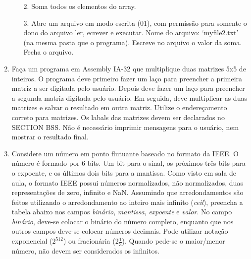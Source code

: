 \begin{enumerate}[resume]
\begin{enumerate}
        \item [2.]
        Soma todos os elementos do array.

        \item [3.]
        Abre um arquivo em modo escrita (01), com permissão
        para somente o dono do arquivo ler, ecrever e executar. 
        Nome do arquivo: `myfile2.txt' (na mesma pasta que o programa). 
        Escreve no arquivo o valor da soma.
        Fecha o arquivo.
    \end{enumerate}

    \item
    Faça um programa em Assembly IA-32
    que multiplique duas matrizes 5x5 de inteiros.
    O programa deve primeiro fazer um laço 
    para preencher a primeira matriz a ser digitada pelo usuário.
    Depois deve fazer um laço 
    para preencher a segunda matriz digitada pelo usuário.
    Em seguida, deve multiplicar as duas matrizes
    e salvar o resultado em outra matriz.
    Utilize o endereçamento correto para matrizes.
    Os labals das matrizes devem ser declarados no SECTION BSS.
    Não é necessário imprimir mensagens para o usuário,
    nem mostrar o resultado final.

    \item
    Considere um número em ponto flutuante baseado no formato da IEEE.
    O número é formado por 6 bits. 
    Um bit para o sinal, 
    os próximos três bits para o expoente,
    e os últimos dois bits para a mantissa.
    Como visto em sala de aula, o formato IEEE possui números normalizados,
    não normalizados, duas representações de zero, infinito e NaN.
    Assumindo que arredondamentos são feitos utilizando
    o arredondamento ao inteiro mais infinito (\textit{ceil}),
    preencha a tabela abaixo nos campos 
    \textit{binário}, \textit{mantissa}, \textit{expoente} e \textit{valor}.
    No campo \textit{binário}, deve-se colocar o binário do número completo,
    enquanto que nos outros campos deve-se colocar números decimais.
    Pode utilizar notação exponencial ($2^{512}$) ou fracionária (2$\frac{1}{3}$).
    Quando pede-se o maior/menor número, não devem ser considerados os infinitos.


\end{enumerate}
